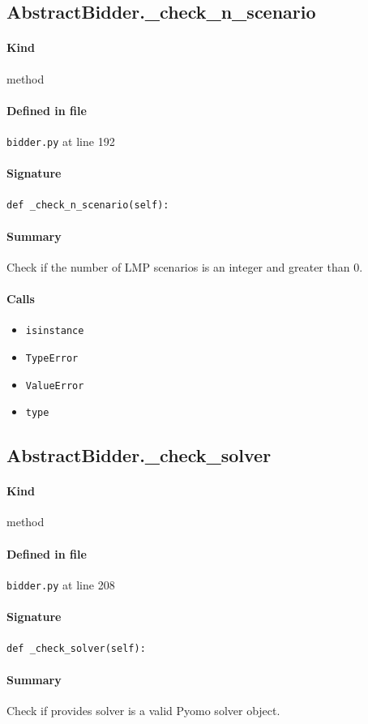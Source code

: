 \documentclass[11pt]{report}
\begin{document}
\subsection{AbstractBidder.\_check\_n\_scenario}
\label{def:bidder.py:AbstractBidder._check_n_scenario:L192}
\paragraph{Kind} method
\paragraph{Defined in file} \texttt{bidder.py} at line 192
\paragraph{Signature} \texttt{def \_check\_n\_scenario(self):}
\paragraph{Summary} Check if the number of LMP scenarios is an integer and greater than 0.
\paragraph{Calls}
\begin{itemize}[leftmargin=*]
  \item \texttt{isinstance}
  \item \texttt{TypeError}
  \item \texttt{ValueError}
  \item \texttt{type}
\end{itemize}
\subsection{AbstractBidder.\_check\_solver}
\label{def:bidder.py:AbstractBidder._check_solver:L208}
\paragraph{Kind} method
\paragraph{Defined in file} \texttt{bidder.py} at line 208
\paragraph{Signature} \texttt{def \_check\_solver(self):}
\paragraph{Summary} Check if provides solver is a valid Pyomo solver object.
\end{document}
